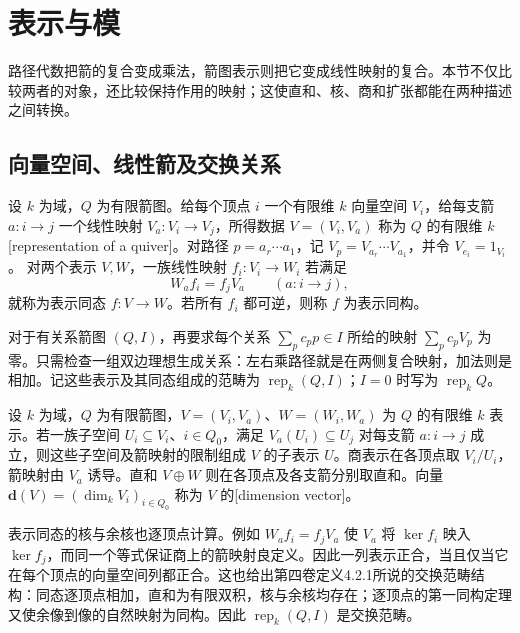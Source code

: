 
\section{表示与模}
\label{b5:sec:0902}


%
%

路径代数把箭的复合变成乘法，箭图表示则把它变成线性映射的复合。本节不仅比较两者的对象，还比较保持作用的映射；这使直和、核、商和扩张都能在两种描述之间转换。

\subsection{向量空间、线性箭及交换关系}
\label{b5:subsec:0902:01}

\begin{definition}\label{b5:def:quiver-representation}
	设 \(k\) 为域，\(Q\) 为有限箭图。给每个顶点 \(i\) 一个有限维 \(k\) 向量空间 \(V_i\)，给每支箭 \(a:i\to j\) 一个线性映射 \(V_a:V_i\to V_j\)，所得数据 \(V=(V_i,V_a)\) 称为 \(Q\) 的有限维 \(k\)[representation of a quiver]。对路径 \(p=a_r\cdots a_1\)，记 \(V_p=V_{a_r}\cdots V_{a_1}\)，并令 \(V_{e_i}=1_{V_i}\)。 对两个表示 \(V,W\)，一族线性映射 \(f_i:V_i\to W_i\) 若满足
	\[
		W_a f_i=f_j V_a\qquad(a:i\to j),
	\]
	就称为表示同态 \(f:V\to W\)。若所有 \(f_i\) 都可逆，则称 \(f\) 为表示同构。
\end{definition}
对于有关系箭图 \((Q,I)\)，再要求每个关系 \(\sum_p c_p p\in I\) 所给的映射 \(\sum_p c_pV_p\) 为零。只需检查一组双边理想生成关系：左右乘路径就是在两侧复合映射，加法则是相加。记这些表示及其同态组成的范畴为 \(\operatorname{rep}_k(Q,I)\)；\(I=0\) 时写为 \(\operatorname{rep}_k Q\)。
\begin{definition}\label{b5:def:quiver-subrepresentation}
	设 \(k\) 为域，\(Q\) 为有限箭图，\(V=(V_i,V_a)\)、\(W=(W_i,W_a)\) 为 \(Q\) 的有限维 \(k\) 表示。若一族子空间 \(U_i\subseteq V_i\)、\(i\in Q_0\)，满足 \(V_a(U_i)\subseteq U_j\) 对每支箭 \(a:i\to j\) 成立，则这些子空间及箭映射的限制组成 \(V\) 的子表示 \(U\)。商表示在各顶点取 \(V_i/U_i\)，箭映射由 \(V_a\) 诱导。直和 \(V\oplus W\) 则在各顶点及各支箭分别取直和。向量 \(\mathbf d(V)=(\dim_kV_i)_{i\in Q_0}\) 称为 \(V\) 的[dimension vector]。
\end{definition}
表示同态的核与余核也逐顶点计算。例如 \(W_a f_i=f_jV_a\) 使 \(V_a\) 将 \(\ker f_i\) 映入 \(\ker f_j\)，而同一个等式保证商上的箭映射良定义。因此一列表示正合，当且仅当它在每个顶点的向量空间列都正合。这也给出第四卷定义4.2.1所说的交换范畴结构：同态逐顶点相加，直和为有限双积，核与余核均存在；逐顶点的第一同构定理又使余像到像的自然映射为同构。因此 \(\operatorname{rep}_k(Q,I)\) 是交换范畴。

